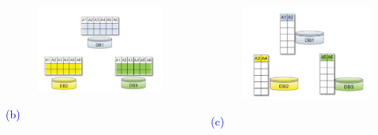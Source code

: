 \documentclass{beamer} %
\newcommand{\blue}[1]{\textcolor{blue}{#1}}
\begin{document}
\begin{frame}
\begin{columns}
\begin{column}{5cm}
\begin{figure}[H]
\centering
\includegraphics[width=1\textwidth]{./DDM2.png}
\end{figure}
\centerline{\blue{(b)}}
\end{column}


\begin{column}{4cm}
\begin{figure}[H]
\centering
\includegraphics[width=1\textwidth]{./DDM3.png}
\end{figure}
\vspace{4mm}
\centerline{\blue{(c)}}
\end{column}

\end{columns}


\end{frame}
\end{document}

